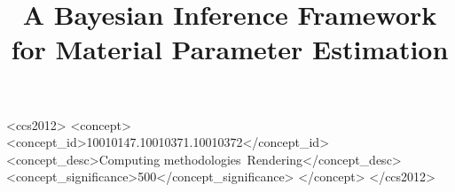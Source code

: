 \documentclass[acmtog, anonymous, review]{acmart}
\begin{document}
 

\title{A Bayesian Inference Framework for Material Parameter Estimation}


%
%
%



\begin{abstract}

\end{abstract}

\begin{CCSXML}
<ccs2012>
<concept>
<concept_id>10010147.10010371.10010372</concept_id>
<concept_desc>Computing methodologies~Rendering</concept_desc>
<concept_significance>500</concept_significance>
</concept>
</ccs2012>
\end{CCSXML}



 




%
\maketitle
%











%
%
\end{document}
